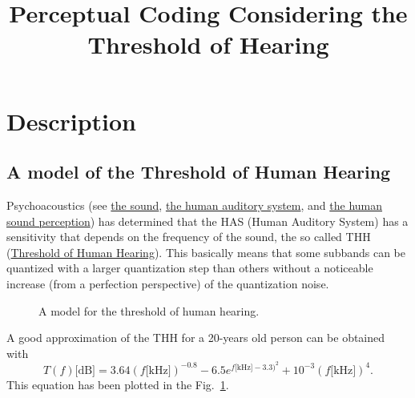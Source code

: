 
\title{Perceptual Coding Considering the Threshold of Hearing}

\maketitle

\section{Description}

\subsection{A model of the Threshold of Human Hearing}

Psychoacoustics (see
\href{https://vicente-gonzalez-ruiz.github.io/the_sound/}{the sound},
\href{https://vicente-gonzalez-ruiz.github.io/human_auditory_system/}{the
  human auditory system}, and
\href{https://vicente-gonzalez-ruiz.github.io/human_sound_perception/}{the
  human sound perception}) has determined that the HAS (Human Auditory
System) has a sensitivity that depends on the frequency of the sound,
the so called THH
(\href{https://en.wikipedia.org/wiki/Absolute_threshold_of_hearing}{Threshold
  of Human Hearing}). This basically means that some subbands can be
quantized with a larger quantization step than others without a
noticeable increase (from a perfection perspective) of the
quantization noise.

\begin{figure}
  \centering
  \caption{A model for the threshold of human hearing.}
  \label{fig:ToHH}
\end{figure}

A good approximation of the THH for a 20-years old person can be
obtained with~\cite{bosi2003intro}
\begin{equation}
  T(f)\text{[dB]} = 3.64(f\text{[kHz]})^{-0.8} - 6.5e^{f\text{[kHz]}-3.3)^2} + 10^{-3}(f\text{[kHz]})^4.
  \label{eq:ToHH}
\end{equation}
This equation has been plotted in the Fig.~\ref{fig:ToHH}.

